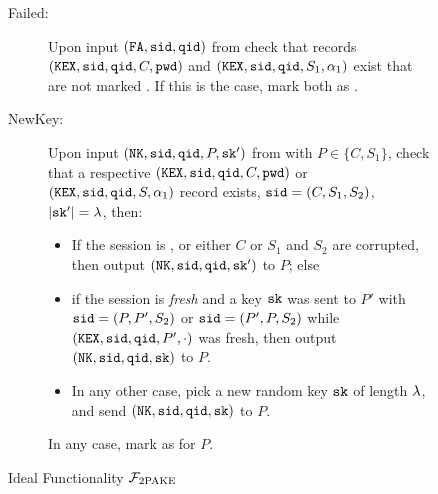 \begin{figure}[tbp]
\begin{mdframed}[innertopmargin=10pt]
\begin{description}
  \item[Failed:] Upon input $(\mathtt{FA}, \mathtt{sid}, \mathtt{qid})$ from \SIM check that records $(\mathtt{KEX}, \mathtt{sid}, \mathtt{qid}, C, \mathtt{pwd})$ and $(\mathtt{KEX}, \mathtt{sid}, \mathtt{qid}, S_1, \alpha_1)$ exist that are not marked \completed. 
      If this is the case, mark both as \failed.
	
	\item[NewKey:] Upon input $(\mathtt{NK}, \mathtt{sid},\mathtt{qid}, P, \mathtt{sk}')$ from \SIM with $P\in\{C,S_1\}$, check that a respective $(\mathtt{KEX}, \mathtt{sid}, \mathtt{qid}, C, \mathtt{pwd})$ or $(\mathtt{KEX}, \mathtt{sid}, \mathtt{qid}, S, \alpha_1)$ record exists, $\mathtt{sid}=(C,S_1,S_2)$, $|\mathtt{sk}'|=\lambda$, then: %
	\begin{itemize}
		\item If the session is \compromised, or either $C$ or $S_1$ and $S_2$ are corrupted, then output $(\mathtt{NK}, \mathtt{sid},\mathtt{qid},\mathtt{sk}')$ to $P$; else
		
		\item if the session is \emph{fresh} and a key $\mathtt{sk}$ was sent to $P'$ with $\mathtt{sid}=(P, P', S_2)$ or $\mathtt{sid}=(P', P, S_2)$ while $(\mathtt{KEX}, \mathtt{sid}, \mathtt{qid}, P', \cdot)$ was fresh, then output $(\mathtt{NK}, \mathtt{sid}, \mathtt{qid}, \mathtt{sk})$ to $P$.
		
		\item In any other case, pick a new random key $\mathtt{sk}$ of length $\lambda$, and send $(\mathtt{NK}, \mathtt{sid}, \mathtt{qid}, \mathtt{sk})$ to $P$.
	\end{itemize}
	In any case, mark \qid as \completed for $P$.
	
\end{description}
\end{mdframed}
\caption{Ideal Functionality $\mathcal{F}_{\mathrm{2PAKE}}$}
\label{fig:2pakef}
\end{figure}

